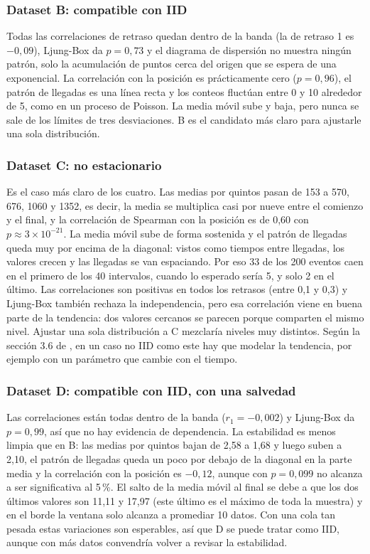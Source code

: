 \documentclass[11pt,letterpaper]{article}
\begin{document}
\subsubsection*{Dataset B: compatible con IID}

Todas las correlaciones de retraso quedan dentro de la banda (la de retraso 1 es $-0{,}09$), Ljung-Box da
$p = 0{,}73$ y el diagrama de dispersión no muestra ningún patrón, solo la acumulación de puntos cerca del origen que
se espera de una exponencial. La correlación con la posición es prácticamente cero ($p = 0{,}96$), el patrón de
llegadas es una línea recta y los conteos fluctúan entre 0 y 10 alrededor de 5, como en un proceso de Poisson. La
media móvil sube y baja, pero nunca se sale de los límites de tres desviaciones. B es el candidato más claro para
ajustarle una sola distribución.

\subsubsection*{Dataset C: no estacionario}

Es el caso más claro de los cuatro. Las medias por quintos pasan de 153 a 570, 676, 1060 y 1352, es decir, la media
se multiplica casi por nueve entre el comienzo y el final, y la correlación de Spearman con la posición es de 0,60
con $p \approx 3 \times 10^{-21}$. La media móvil sube de forma sostenida y el patrón de llegadas queda muy por
encima de la diagonal: vistos como tiempos entre llegadas, los valores crecen y las llegadas se van espaciando. Por
eso 33 de los 200 eventos caen en el primero de los 40 intervalos, cuando lo esperado sería 5, y solo 2 en el
último. Las correlaciones son positivas en todos los retrasos (entre 0,1 y 0,3) y Ljung-Box también rechaza la
independencia, pero esa correlación viene en buena parte de la tendencia: dos valores cercanos se parecen porque
comparten el mismo nivel. Ajustar una sola distribución a C mezclaría niveles muy distintos. Según la sección 3.6 de
\cite{banks98}, en un caso no IID como este hay que modelar la tendencia, por ejemplo con un parámetro que cambie con
el tiempo.

\subsubsection*{Dataset D: compatible con IID, con una salvedad}

Las correlaciones están todas dentro de la banda ($r_1 = -0{,}002$) y Ljung-Box da $p = 0{,}99$, así que no hay
evidencia de dependencia. La estabilidad es menos limpia que en B: las medias por quintos bajan de 2,58 a 1,68 y
luego suben a 2,10, el patrón de llegadas queda un poco por debajo de la diagonal en la parte media y la correlación
con la posición es $-0{,}12$, aunque con $p = 0{,}099$ no alcanza a ser significativa al 5\,\%. El salto de la media
móvil al final se debe a que los dos últimos valores son 11,11 y 17,97 (este último es el máximo de toda la muestra)
y en el borde la ventana solo alcanza a promediar 10 datos. Con una cola tan pesada estas variaciones son
esperables, así que D se puede tratar como IID, aunque con más datos convendría volver a revisar la estabilidad.
\end{document}
